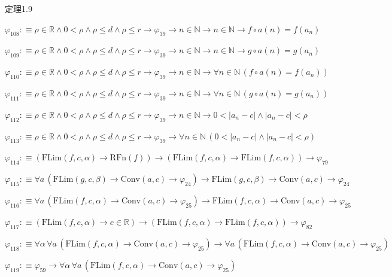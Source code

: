 \begin{fullproof}{定理1.9}
\begin{abbrevlist}
\item $\varphi_{108} :\equiv \rho \in \mathbb{R} \land 0 < \rho \land \rho \leq d \land \rho \leq r \to \varphi_{39} \to n \in \mathbb{N} \to n \in \mathbb{N} \to f \circ a(n) = f(a_{n})$
\item $\varphi_{109} :\equiv \rho \in \mathbb{R} \land 0 < \rho \land \rho \leq d \land \rho \leq r \to \varphi_{39} \to n \in \mathbb{N} \to n \in \mathbb{N} \to g \circ a(n) = g(a_{n})$
\item $\varphi_{110} :\equiv \rho \in \mathbb{R} \land 0 < \rho \land \rho \leq d \land \rho \leq r \to \varphi_{39} \to n \in \mathbb{N} \to \forall n \in \mathbb{N}\,(f \circ a(n) = f(a_{n}))$
\item $\varphi_{111} :\equiv \rho \in \mathbb{R} \land 0 < \rho \land \rho \leq d \land \rho \leq r \to \varphi_{39} \to n \in \mathbb{N} \to \forall n \in \mathbb{N}\,(g \circ a(n) = g(a_{n}))$
\item $\varphi_{112} :\equiv \rho \in \mathbb{R} \land 0 < \rho \land \rho \leq d \land \rho \leq r \to \varphi_{39} \to n \in \mathbb{N} \to 0 < \lvert a_{n} - c \rvert \land \lvert a_{n} - c \rvert < \rho$
\item $\varphi_{113} :\equiv \rho \in \mathbb{R} \land 0 < \rho \land \rho \leq d \land \rho \leq r \to \varphi_{39} \to \forall n \in \mathbb{N}\,(0 < \lvert a_{n} - c \rvert \land \lvert a_{n} - c \rvert < \rho)$
\item $\varphi_{114} :\equiv (\mathrm{FLim}(f,c,\alpha) \to \mathrm{RFn}(f)) \to (\mathrm{FLim}(f,c,\alpha) \to \mathrm{FLim}(f,c,\alpha)) \to \varphi_{79}$
\item $\varphi_{115} :\equiv \forall a\,(\mathrm{FLim}(g,c,\beta) \to \mathrm{Conv}(a,c) \to \varphi_{24}) \to \mathrm{FLim}(g,c,\beta) \to \mathrm{Conv}(a,c) \to \varphi_{24}$
\item $\varphi_{116} :\equiv \forall a\,(\mathrm{FLim}(f,c,\alpha) \to \mathrm{Conv}(a,c) \to \varphi_{25}) \to \mathrm{FLim}(f,c,\alpha) \to \mathrm{Conv}(a,c) \to \varphi_{25}$
\item $\varphi_{117} :\equiv (\mathrm{FLim}(f,c,\alpha) \to c \in \mathbb{R}) \to (\mathrm{FLim}(f,c,\alpha) \to \mathrm{FLim}(f,c,\alpha)) \to \varphi_{82}$
\item $\varphi_{118} :\equiv \forall \alpha\,\forall a\,(\mathrm{FLim}(f,c,\alpha) \to \mathrm{Conv}(a,c) \to \varphi_{25}) \to \forall a\,(\mathrm{FLim}(f,c,\alpha) \to \mathrm{Conv}(a,c) \to \varphi_{25})$
\item $\varphi_{119} :\equiv \varphi_{59} \to \forall \alpha\,\forall a\,(\mathrm{FLim}(f,c,\alpha) \to \mathrm{Conv}(a,c) \to \varphi_{25})$

\end{abbrevlist}
\end{fullproof}
